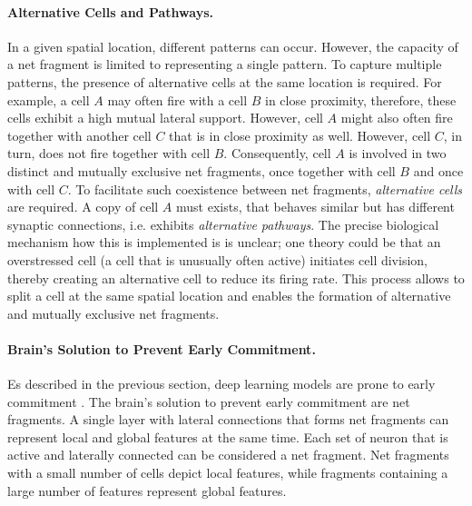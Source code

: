 \paragraph{Alternative Cells and Pathways.} In a given spatial location, different patterns can occur.
However, the capacity of a net fragment is limited to representing a single pattern.
To capture multiple patterns, the presence of alternative cells at the same location is required.
For example, a cell $A$ may often fire with a cell $B$ in close proximity, therefore, these cells exhibit a high mutual lateral support.
However, cell $A$ might also often fire together with another cell $C$ that is in close proximity as well. However, cell $C$, in turn, does not fire together with cell $B$. Consequently, cell $A$ is involved in two distinct and mutually exclusive net fragments, once together with cell $B$ and once with cell $C$.
To facilitate such coexistence between net fragments, \emph{alternative cells} are required. A copy of cell $A$ must exists, that behaves similar but has different synaptic connections, i.e. exhibits \emph{alternative pathways}.
The precise biological mechanism how this is implemented is is unclear; one theory could be that an overstressed cell (a cell that is unusually often active) initiates cell division, thereby creating an alternative cell to reduce its firing rate. This process allows to split a cell at the same spatial location and enables the formation of alternative and mutually exclusive net fragments.

\paragraph{Brain's Solution to Prevent Early Commitment.}
Es described in the previous section, deep learning models are prone to early commitment .
The brain's solution to prevent early commitment are net fragments.
A single layer with lateral connections that forms net fragments can represent local and global features at the same time.
Each set of neuron that is active and laterally connected can be considered a net fragment. Net fragments with a small number of cells depict local features, while fragments containing a large number of features represent global features.

